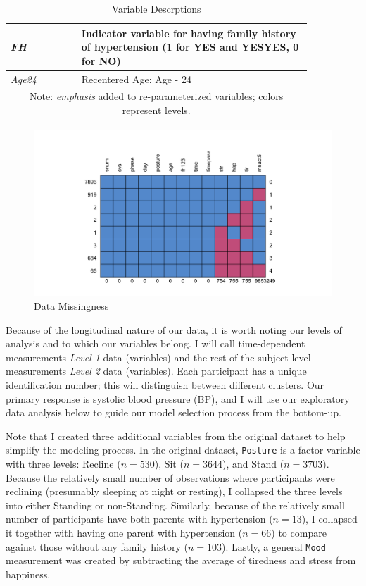 \documentclass[12pt,twoside,letterpaper]{article}
\theoremstyle{definition}
\theoremstyle{definition}
\begin{document}
\begin{table}
\begin{tabular}{|p{0.2\linewidth} | p{0.65\linewidth}|}
        \hline
        \emph{\textcolor[RGB]{74, 144, 226}{FH}} & Indicator variable for having family history of hypertension (1 for YES and YESYES, 0 for NO) \\
        \hline
        \emph{\textcolor[RGB]{74, 144, 226}{Age24}} & Recentered Age: Age - 24 \\
        \hline
        \multicolumn{2}{c}{\footnotesize Note: \emph{emphasis} added to re-parameterized variables; colors represent levels.}
    \end{tabular}
    \caption{Variable Descrptions}
    \label{tab: var desc}
\end{table}

\begin{figure}
\centering
\includegraphics[width=\textwidth]{pics/miss.png}
\caption{Data Missingness}
\label{fig: missing}
\end{figure}

Because of the longitudinal nature of our data, it is worth noting our levels of analysis and to which our variables belong. I will call time-dependent measurements \emph{\textcolor[RGB]{208, 2, 27}{Level 1}} data (variables) and the rest of the subject-level measurements \emph{\textcolor[RGB]{74, 144, 226}{Level 2}} data (variables). Each participant has a unique identification number; this will distinguish between different clusters. Our primary response is systolic blood pressure (BP), and I will use our exploratory data analysis below to guide our model selection process from the bottom-up.

Note that I created three additional variables from the original dataset to help simplify the modeling process. In the original dataset, \texttt{Posture} is a factor variable with three levels: Recline ($n = 530$), Sit ($n = 3644$), and Stand ($n = 3703$). Because the relatively small number of observations where participants were reclining (presumably sleeping at night or resting), I collapsed the three levels into either Standing or non-Standing. Similarly, because of the relatively small number of participants have both parents with hypertension ($n = 13$), I collapsed it together with having one parent with hypertension ($n = 66$) to compare against those without any family history ($n = 103$). Lastly, a general \texttt{Mood} measurement was created by subtracting the average of tiredness and stress from happiness. 
\end{document}
